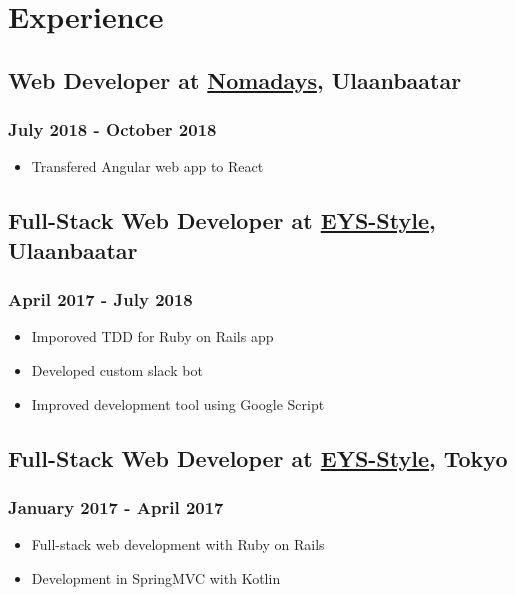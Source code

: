 \documentclass[letterpaper]{article}
\date{\today}
\title{}
\begin{document}

\section{Experience}
\label{sec:org9218cbc}
\subsection{Web Developer at \href{https:nomadays.com}{Nomadays}, Ulaanbaatar}
\label{sec:org7c9cd9c}
\subsubsection{July 2018 - October 2018}
\label{sec:org3d806f9}
\begin{itemize}
\item Transfered Angular web app to React
\end{itemize}
\subsection{Full-Stack Web Developer at \href{http:www.eys-style.com}{EYS-Style}, Ulaanbaatar}
\label{sec:org2566a59}
\subsubsection{April 2017 - July 2018}
\label{sec:orgdc156c1}
\begin{itemize}
\item Imporoved TDD for Ruby on Rails app
\item Developed custom slack bot
\item Improved development tool using Google Script
\end{itemize}
\subsection{Full-Stack Web Developer at \href{http:www.eys-style.com}{EYS-Style}, Tokyo}
\label{sec:orgd48c515}
\subsubsection{January 2017 - April 2017}
\label{sec:org52f080a}
\begin{itemize}
\item Full-stack web development with Ruby on Rails
\item Development in SpringMVC with Kotlin
\end{itemize}
\end{document}
